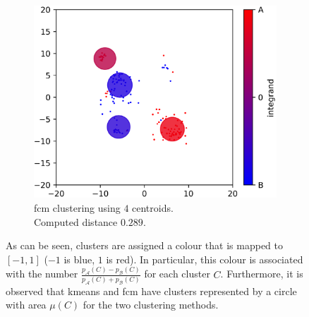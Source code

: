 \begin{modified}
\begin{figure}[H]
\begin{subfigure}{0.48\linewidth}
		\label{fig:kmeans_clustering}
	\end{subfigure}
	\begin{subfigure}{\linewidth}
		\includegraphics[width=\linewidth]{Figures/fcm_comparison.png}
		\caption[\gls{fcm} clustering, example of comparison]{\gls{fcm} clustering using $4$ centroids.\\ Computed distance $0.289$.}
		\label{fig:fcm_clustering}
	\end{subfigure}
	\caption[Comparing $3$ clustering techniques]{As can be seen, clusters are assigned a colour that is mapped to $[-1,1]$ ($-1$ is blue, $1$ is red). In particular, this colour is associated with the number $\frac{p_\mathcal{A}(C)-p_\mathcal{B}(C)}{p_\mathcal{A}(C)+p_\mathcal{B}(C)}$ for each cluster $C$. Furthermore, it is observed that \gls{kmeans} and \gls{fcm} have clusters represented by a circle with area $\mu(C)$ for the two clustering methods.}
\end{figure}
\end{modified}

